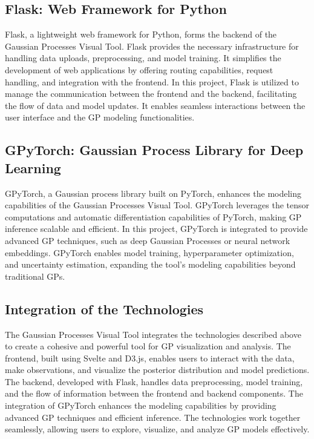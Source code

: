 \documentclass[preprint,journal]{vgtc}       %
\begin{document}
\subsection{Flask: Web Framework for Python}

Flask, a lightweight web framework for Python, forms the backend of the Gaussian Processes Visual Tool. Flask provides the necessary infrastructure for handling data uploads, preprocessing, and model training. It simplifies the development of web applications by offering routing capabilities, request handling, and integration with the frontend. In this project, Flask is utilized to manage the communication between the frontend and the backend, facilitating the flow of data and model updates. It enables seamless interactions between the user interface and the GP modeling functionalities.

\subsection{GPyTorch: Gaussian Process Library for Deep Learning}

GPyTorch, a Gaussian process library built on PyTorch, enhances the modeling capabilities of the Gaussian Processes Visual Tool. GPyTorch leverages the tensor computations and automatic differentiation capabilities of PyTorch, making GP inference scalable and efficient. In this project, GPyTorch is integrated to provide advanced GP techniques, such as deep Gaussian Processes or neural network embeddings. GPyTorch enables model training, hyperparameter optimization, and uncertainty estimation, expanding the tool's modeling capabilities beyond traditional GPs.

\subsection{Integration of the Technologies}

The Gaussian Processes Visual Tool integrates the technologies described above to create a cohesive and powerful tool for GP visualization and analysis. The frontend, built using Svelte and D3.js, enables users to interact with the data, make observations, and visualize the posterior distribution and model predictions. The backend, developed with Flask, handles data preprocessing, model training, and the flow of information between the frontend and backend components. The integration of GPyTorch enhances the modeling capabilities by providing advanced GP techniques and efficient inference. The technologies work together seamlessly, allowing users to explore, visualize, and analyze GP models effectively.
\end{document}

